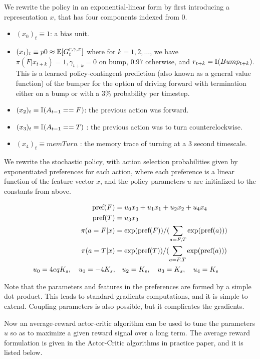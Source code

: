 \documentclass{article}
\begin{document}
 We rewrite the policy in an exponential-linear form by first introducing a representation $x$, that has four components indexed from 0.
\begin{itemize}
\item $(x_0)_t \equiv 1 $: a bias unit.
\item $(x_1)_t \equiv p0 \approx \mathbb{E}[ G_t^{r,\gamma,\pi}]$ where for $k=1,2,\ldots$, we have $ \pi(F|x_{t+k})=1, \gamma_{t+k}=0$ on bump, $0.97$ otherwise, and $r_{t+k}=\mathbb{I}(Bump_{t+k})$.  This is a learned policy-contingent prediction (also known as a general value function) of the bumper for the option of driving forward with termination either on a bump or with a 3\% probability per timestep.
\item $(x_2)_t\equiv \mathbb{I}(A_{t-1}==F) $: the previous action was forward.
  \item $(x_3)_t \equiv \mathbb{I}(A_{t-1}==T) $ : the previous action was to turn counterclockwise.
  \item $(x_4)_t \equiv memTurn $ : the memory trace of turning at a 3 second timescale.
\end{itemize}

We rewrite the stochastic policy, with action selection probabilities given by exponentiated preferences for each action, where each preference is a linear function of the feature vector $x$, and the policy parameters $u$ are initialized to the constants from above.

\begin{align*}
 \text{pref}(F) &= u_0 x_0 + u_1 x_1 + u_2 x_2  + u_4 x_4\\
 \text{pref}(T) &= u_3 x_3 \\
 \pi( a=F | x) &= \exp(\text{pref}(F)) / (\sum_{a=F,T} \exp(\text{pref}(a))) \\
 \pi( a=T | x) &= \exp(\text{pref}(T))  / (\sum_{a=F,T} \exp(\text{pref}(a))) \\
 u_0 = 4eq K_s, \quad u_1 = -4K_s, &\quad u_2 = K_s, \quad u_3=K_s, \quad u_4=K_s 
\end{align*}




Note that the parameters and features in the preferences are formed by a simple dot product.  This leads to standard gradients computations, and it is simple to extend.  Coupling parameters is also possible, but it complicates the gradients.

Now an average-reward actor-critic algorithm can be used to tune the parameters $u$ so as to maximize a given reward signal over a long term.
The average reward formulation is given in the Actor-Critic algorithms in practice paper, and it is listed below.
\end{document}
